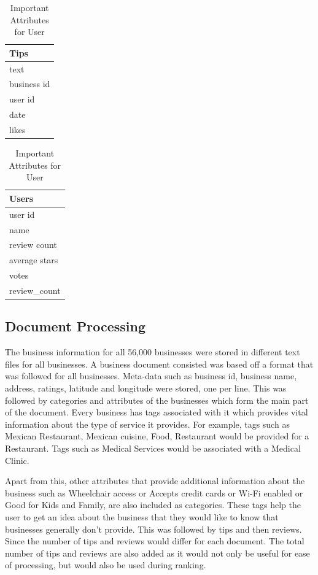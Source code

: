 \documentclass[paper=letter, fontsize=15pt]{article} %
\begin{document}
\begin{table}[h!]
\begin{minipage}{.5\linewidth}
\centering
\begin{tabular}{|l|}
\hline
\textbf{Tips} \\\hline
text\\\hline
business id\\\hline
user id\\\hline
date\\\hline
likes\\\hline
\end{tabular}
\caption{Important Attributes for Tips }
\label{}
\end{minipage}
\begin{minipage}{.5\linewidth}
\centering
\begin{tabular}{|l|}
\hline
\textbf{Users} \\\hline
user id\\\hline
name\\\hline
review count\\\hline
average stars\\\hline
votes\\\hline
review\_count\\ \hline
\end{tabular}
\caption{Important Attributes for User }
\label{}
\end{minipage}
\end{table}




 
\subsection{Document Processing}
The business information for all 56,000 businesses were stored in different text files for all businesses. A business document consisted was based off a format that was followed for all businesses. Meta-data such as business id, business name, address, ratings, latitude and longitude were stored, one per line. This was followed by categories and attributes of the businesses which form the main part of the document.
Every business has tags associated with it which provides vital information about the type of service it provides. For example, tags such as Mexican Restaurant, Mexican cuisine, Food, Restaurant would be provided for a Restaurant. Tags such as Medical Services would be associated with a Medical Clinic.

Apart from this, other attributes that provide additional information about the business such as Wheelchair access or Accepts credit cards or Wi-Fi enabled or Good for Kids and Family, are also included as categories. These tags help the user to get an idea about the business that they would like to know that businesses generally don't provide.
This was followed by tips and then reviews. Since the number of tips and reviews would differ for each document. The total number of tips and reviews are also added as it would not only be useful for ease of processing, but would also be used during ranking.  
\end{document}

